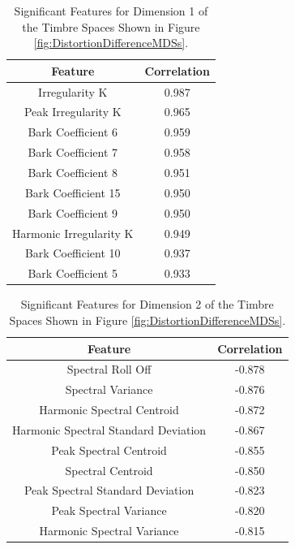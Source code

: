 	\begin{table}[h!]
		\centering
		\begin{tabular}{|c|c|}
			\hline
			\bf{Feature} & \bf{Correlation} \\
			\hline
			\hline
			Irregularity K & 0.987 \\
			\hline
			Peak Irregularity K & 0.965 \\
			\hline
			Bark Coefficient 6 & 0.959 \\
			\hline
			Bark Coefficient 7 & 0.958 \\
			\hline
			Bark Coefficient 8 & 0.951 \\
			\hline
			Bark Coefficient 15 & 0.950 \\
			\hline
			Bark Coefficient 9 & 0.950 \\
			\hline
			Harmonic Irregularity K & 0.949 \\
			\hline
			Bark Coefficient 10 & 0.937 \\
			\hline
			Bark Coefficient 5 & 0.933 \\
			\hline
		\end{tabular}
		\caption{Significant Features for Dimension 1 of the Timbre Spaces Shown in Figure 
			 \ref{fig:DistortionDifferenceMDSs}.}
		\label{tab:DistortionDifferenceFeatures}
	\end{table}

	\begin{table}[h!]
		\centering
		\begin{tabular}{|c|c|}
			\hline
			\bf{Feature} & \bf{Correlation} \\
			\hline
			\hline
			Spectral Roll Off & -0.878 \\
			\hline
			Spectral Variance & -0.876 \\
			\hline
			Harmonic Spectral Centroid & -0.872 \\
			\hline
			Harmonic Spectral Standard Deviation & -0.867 \\
			\hline
			Peak Spectral Centroid & -0.855 \\
			\hline
			Spectral Centroid & -0.850 \\
			\hline
			Peak Spectral Standard Deviation & -0.823 \\
			\hline
			Peak Spectral Variance & -0.820 \\
			\hline
			Harmonic Spectral Variance & -0.815 \\
			\hline
		\end{tabular}
		\caption{Significant Features for Dimension 2 of the Timbre Spaces Shown in Figure 
			 \ref{fig:DistortionDifferenceMDSs}.}
		\label{tab:DistortionDifferenceFeatures}
	\end{table}

